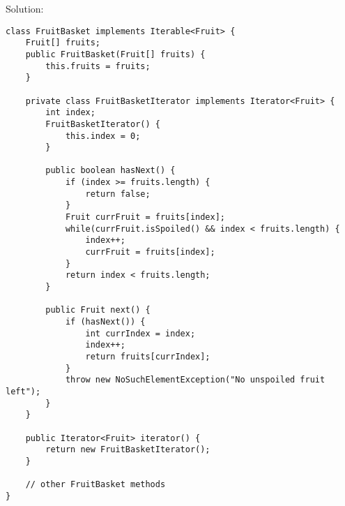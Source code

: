 \begin{solution}[3in]
Solution:
\begin{lstlisting}
class FruitBasket implements Iterable<Fruit> {
    Fruit[] fruits;
    public FruitBasket(Fruit[] fruits) {
        this.fruits = fruits;
    }
    
    private class FruitBasketIterator implements Iterator<Fruit> {
        int index;
    	FruitBasketIterator() {
    	    this.index = 0;
        }
    
    	public boolean hasNext() {
            if (index >= fruits.length) {
                return false;
            }
    	    Fruit currFruit = fruits[index];
    	    while(currFruit.isSpoiled() && index < fruits.length) {
    	        index++;
    	        currFruit = fruits[index];
    	    }
    	    return index < fruits.length;
        }

        public Fruit next() {
            if (hasNext()) {
                int currIndex = index;
                index++;
                return fruits[currIndex];
            }
            throw new NoSuchElementException("No unspoiled fruit left");
        }
    }

    public Iterator<Fruit> iterator() {
    	return new FruitBasketIterator();
    }
    
    // other FruitBasket methods
}
\end{lstlisting}
\end{solution}